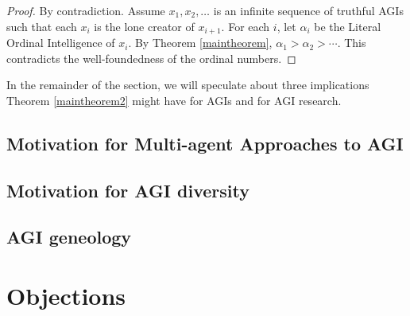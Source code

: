 \documentclass[runningheads]{llncs}
\begin{document}
\begin{proof}
By contradiction. Assume $x_1,x_2,\ldots$ is an infinite sequence of truthful AGIs such
that each $x_i$ is the lone creator of $x_{i+1}$. For each $i$, let $\alpha_i$
be the Literal Ordinal Intelligence of $x_i$. By Theorem \ref{maintheorem},
$\alpha_1>\alpha_2>\cdots$. This contradicts the well-foundedness of the ordinal
numbers.
\end{proof}

In the remainder of the section, we will speculate about three implications
Theorem \ref{maintheorem2} might have for AGIs and for AGI research.

\subsection{Motivation for Multi-agent Approaches to AGI}

\subsection{Motivation for AGI diversity}

\subsection{AGI geneology}


\section{Objections}
\label{objectionsection}



\end{document}
